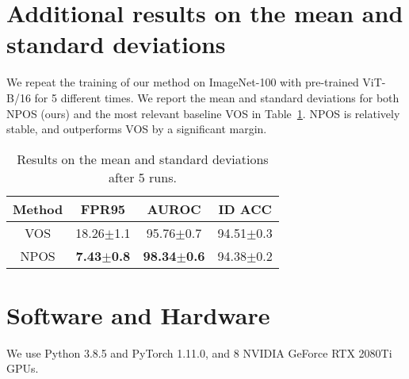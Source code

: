 \begin{table}[h]
  \centering
  \caption{Ablation on different implementations of the non-parametric density estimation. 
  }
  \label{tab:sampling_strategy}\end{table}


\section{Additional results on the mean and standard deviations}
We repeat the training of our method on ImageNet-100 with pre-trained ViT-B/16 for 5 different times. We report the mean and standard deviations for both NPOS (ours) and the most relevant baseline VOS in Table~\ref{tab:mean_std}. NPOS is relatively stable, and outperforms VOS by a significant margin. 

  
\begin{table}[!h]
    \centering
    \small 
    \caption{Results on the mean and standard deviations after 5 runs.}
     \begin{tabular}{c|ccc}
      \toprule
    Method	&FPR95	&AUROC&	ID ACC  \\
      \midrule
    VOS	&18.26\(\pm\)1.1&95.76\(\pm\)0.7&94.51\(\pm\)0.3 \\
NPOS&\textbf{7.43}\(\pm\)\textbf{0.8}&\textbf{98.34}\(\pm\)\textbf{0.6}&94.38\(\pm\)0.2\\
      \bottomrule
      \end{tabular}\label{tab:mean_std}\vspace{-1em}
  \end{table}






\section{Software and Hardware}
\label{sec:hardware}
We use Python 3.8.5 and PyTorch 1.11.0, and 8 NVIDIA GeForce RTX 2080Ti GPUs.

